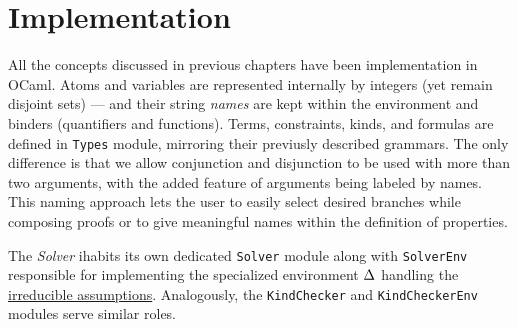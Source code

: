 \documentclass[english, mgr]{iithesis}
\renewcommand{\tt}[1]{\texttt{\small{#1}}}
\renewcommand{\it}[1]{\textit{#1}}
\begin{document}
\chapter{Implementation}
All the concepts discussed in previous chapters have been implementation in OCaml.
Atoms and variables are represented internally by integers (yet remain disjoint sets)
--- and their string \it{names} are kept within the environment and binders
(quantifiers and functions).
Terms, constraints, kinds, and formulas are defined in \tt{Types} module,
mirroring their previusly described grammars.
The only difference is that we allow conjunction and disjunction to be used with
more than two arguments, with the added feature of arguments being labeled by names.
This naming approach lets the user to easily select desired branches while composing proofs
or to give meaningful names within the definition of properties.

The \it{Solver} ihabits its own dedicated \tt{Solver} module along with \tt{SolverEnv}
responsible for implementing the specialized environment $\Delta$ handling the \hyperref[sec:solverenv]{irreducible assumptions}.
Analogously, the \tt{KindChecker} and \tt{KindCheckerEnv} modules serve similar roles.
\end{document}
